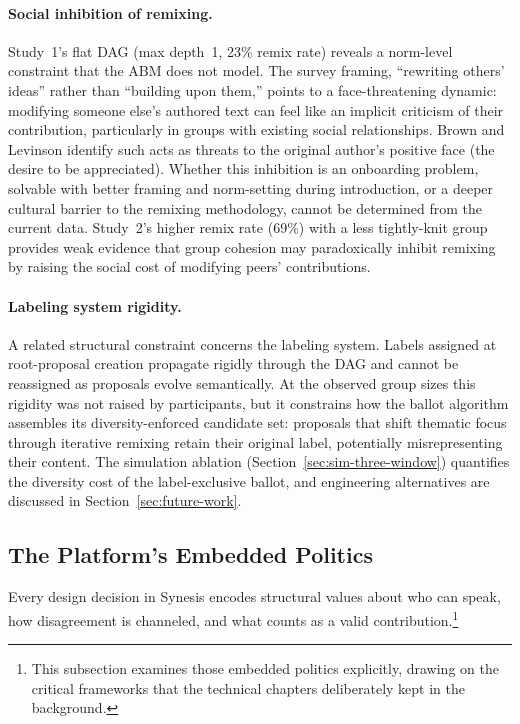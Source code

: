 \documentclass[a4paper, 12pt, twoside]{iviathesis}
\begin{document}
\paragraph{Social inhibition of remixing.}
Study~1's flat DAG (max depth~1, 23\% remix rate) reveals a norm-level constraint that the ABM does not model. The survey framing, ``rewriting others' ideas'' rather than ``building upon them,'' points to a face-threatening dynamic: modifying someone else's authored text can feel like an implicit criticism of their contribution, particularly in groups with existing social relationships. Brown and Levinson \cite{brown1987politeness} identify such acts as threats to the original author's positive face (the desire to be appreciated). Whether this inhibition is an onboarding problem, solvable with better framing and norm-setting during introduction, or a deeper cultural barrier to the remixing methodology, cannot be determined from the current data. Study~2's higher remix rate (69\%) with a less tightly-knit group provides weak evidence that group cohesion may paradoxically inhibit remixing by raising the social cost of modifying peers' contributions.

\paragraph{Labeling system rigidity.}
A related structural constraint concerns the labeling system. Labels assigned at root-proposal creation propagate rigidly through the DAG and cannot be reassigned as proposals evolve semantically. At the observed group sizes this rigidity was not raised by participants, but it constrains how the ballot algorithm assembles its diversity-enforced candidate set: proposals that shift thematic focus through iterative remixing retain their original label, potentially misrepresenting their content. The simulation ablation (Section~\ref{sec:sim-three-window}) quantifies the diversity cost of the label-exclusive ballot, and engineering alternatives are discussed in Section~\ref{sec:future-work}.


\subsection{The Platform's Embedded Politics}
\label{sec:embedded-politics}

Every design decision in Synesis encodes structural values about who can speak, how disagreement is channeled, and what counts as a valid contribution.\footnote{This subsection examines those embedded politics explicitly, drawing on the critical frameworks that the technical chapters deliberately kept in the background.}
\end{document}
